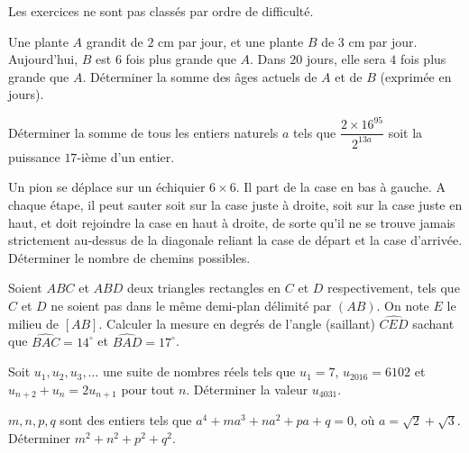 Les exercices ne sont pas classés par ordre de difficulté.



\begin{exo}
Une plante $A$ grandit de $2$ cm par jour, et une plante $B$ de $3$ cm par jour. Aujourd'hui, $B$ est $6$ fois
plus grande que $A$. Dans $20$ jours, elle sera $4$ fois plus grande que $A$. Déterminer la somme des
âges actuels de $A$ et de $B$ (exprimée en jours). 
\end{exo}



\begin{exo}
 Déterminer la somme de tous les entiers naturels $a$ tels que $\dfrac{2\times 16^{95}}{2^{13a}}$ soit la puissance $17$-ième
d'un entier.
\end{exo}



\begin{exo}
 Un pion se déplace sur un échiquier $6\times 6$. Il part de la case en bas à gauche. A chaque étape, il peut sauter soit
sur la case juste à droite, soit sur la case juste en haut, et doit rejoindre la case en haut à droite, de sorte qu'il ne se
trouve jamais strictement au-dessus de la diagonale reliant la case de départ et la case d'arrivée. Déterminer le nombre
de chemins possibles.
\end{exo}


\begin{exo}
Soient $ABC$ et $ABD$ deux triangles rectangles en $C$ et $D$ respectivement, tels que $C$ et $D$ ne soient pas dans le même
demi-plan délimité par $(AB)$. On note $E$ le milieu de $[AB]$. Calculer la mesure en degrés de
l'angle (saillant) $\widehat{CED}$ sachant que $\widehat{BAC}=14^\circ$
et $\widehat{BAD}=17^\circ$.
\end{exo}




\begin{exo}
Soit $u_1,u_2,u_3,\ldots$ une suite de nombres réels tels que $u_1=7$, $u_{2016}=6102$ et $u_{n+2}+u_n=2u_{n+1}$ pour tout $n$.
Déterminer la valeur $u_{4031}$. 
\end{exo}



\begin{exo}
 $m,n,p,q$ sont des entiers tels que $a^4+ma^3+na^2+pa+q=0$, où $a=\sqrt{2}+\sqrt{3}$. Déterminer $m^2+n^2+p^2+q^2$.
\end{exo}



